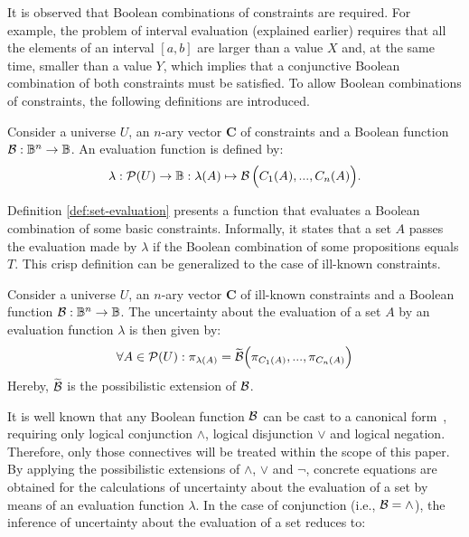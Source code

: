 It is observed that Boolean combinations of constraints are required. For example, the problem of interval evaluation (explained earlier) requires that all the elements of an interval $[a,b]$ are larger than a value $X$ and, at the same time, smaller than a value $Y$, which implies that a conjunctive Boolean combination of both constraints must be satisfied. To allow Boolean combinations of constraints, the following definitions are introduced.
\begin{definition}
\label{def:set-evaluation}
Consider a universe $U$, an $n$-ary vector $\mathbf{C}$ of constraints and a Boolean function $\operatorname*{\mathcal{B}}:\mathbb{B}^{n}\rightarrow\mathbb{B}$. An evaluation function is defined by:
\begin{equation}
\lambda:\mathcal{P}(U)\rightarrow\mathbb{B}:\lambda(A)\mapsto\operatorname*{\mathcal{B}}\Big(C_{1}(A),...,C_{n}(A)\Big).
\end{equation}
\end{definition}
Definition \ref{def:set-evaluation} presents a function that evaluates a Boolean combination of some basic constraints. Informally, it states that a set $A$ passes the evaluation made by $\lambda$ if the Boolean combination of some propositions equals $T$. This crisp definition can be generalized to the case of ill-known constraints.
\begin{definition}
\label{def:ill-known-sets}
Consider a universe $U$, an $n$-ary vector $\mathbf{C}$ of ill-known constraints and a Boolean function $\operatorname*{\mathcal{B}}:\mathbb{B}^{n}\rightarrow\mathbb{B}$. The uncertainty about the evaluation of a set $A$ by an evaluation function $\lambda$ is then given by:
\begin{equation}
\forall A\in\mathcal{P}(U):\pi_{\lambda(A)}=\widetilde{\operatorname*{\mathcal{B}}}\Big(\pi_{C_1(A)},...,\pi_{C_n(A)}\Big)\\
\end{equation}
Hereby, $\widetilde{\operatorname*{\mathcal{B}}}$ is the possibilistic extension of $\operatorname*{\mathcal{B}}$.
\end{definition}
It is well known that any Boolean function $\operatorname*{\mathcal{B}}$ can be cast to a canonical form~\cite{McCluskey1965}, requiring only logical conjunction $\wedge$, logical disjunction $\vee$ and logical negation. Therefore, only those connectives will be treated within the scope of this paper. By applying the possibilistic extensions of $\wedge$, $\vee$ and $\neg$, concrete equations are obtained for the calculations of uncertainty about the evaluation of a set by means of an evaluation function $\lambda$. In the case of conjunction (i.e., $\operatorname*{\mathcal{B}}=\wedge$), the inference of uncertainty about the evaluation of a set reduces to:
